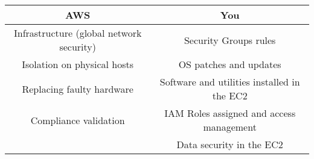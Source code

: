 \begin{table}[h]
	\centering
	\begin{tabular}{||c c||}
		\hline
		\multicolumn{1}{||c|}{\textbf{AWS}}                                & \textbf{You} \\ \hline
		\multicolumn{1}{||c|}{Infrastructure (global network security)}    & Security Groups rules \\ \hline
		\multicolumn{1}{||c|}{Isolation on physical hosts}    			   & OS patches and updates \\ \hline
		\multicolumn{1}{||c|}{Replacing faulty hardware}                   & Software and utilities installed in the EC2 \\ \hline
		\multicolumn{1}{||c|}{Compliance validation}                       & IAM Roles assigned and access management \\ \hline
		\multicolumn{1}{||c|}{}                       					   & Data security in the EC2 \\ \hline
	\end{tabular}
	\newline\newline
	\label{tab:ec2-shared-responsibility-model-table}
\end{table}
